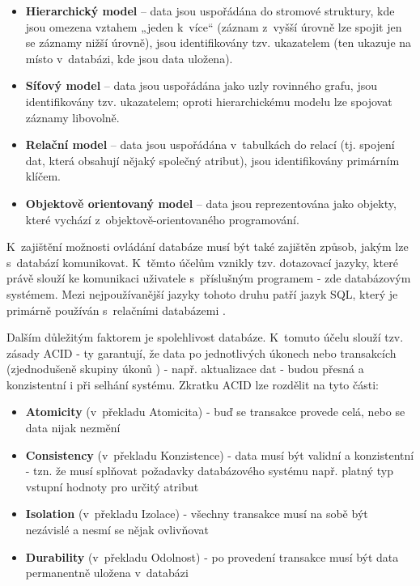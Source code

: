 	\begin{itemize}
		\item \textbf{Hierarchický model} – data jsou uspořádána do stromové struktury, kde jsou omezena vztahem „jeden k~více“ (záznam z~vyšší úrovně lze spojit jen se záznamy nižší úrovně), jsou identifikovány tzv. ukazatelem (ten ukazuje na místo v~databázi, kde jsou data uložena). \cite{HierarchDB}
		\item \textbf{Síťový model} – data jsou uspořádána jako uzly rovinného grafu, jsou identifikovány tzv. ukazatelem; oproti hierarchickému modelu lze spojovat záznamy libovolně. \cite{SitDB} 
		\item \textbf{Relační model} – data jsou uspořádána v~tabulkách do relací (tj. spojení dat, která obsahují nějaký společný atribut), jsou identifikovány primárním klíčem. \cite{RelacDB}
		\item \textbf{Objektově orientovaný model} – data jsou reprezentována jako objekty, které vychází z~objektově-orientovaného programování. \cite{OOPDB}
	\end{itemize}
	
	K~zajištění možnosti ovládání databáze musí být také zajištěn způsob, jakým lze s~databází komunikovat. K~těmto účelům vznikly tzv. dotazovací jazyky, které právě slouží ke komunikaci uživatele s~příslušným programem \cite{DotazJazyk} - zde databázovým systémem. Mezi nejpoužívanější jazyky tohoto druhu patří jazyk SQL, který je primárně používán s~relačními databázemi \cite{SQL}.
	
	Dalším důležitým faktorem je spolehlivost databáze. K~tomuto účelu slouží tzv. zásady ACID - ty garantují, že data po jednotlivých úkonech nebo transakcích (zjednodušeně skupiny úkonů \cite{Transakce}) - např. aktualizace dat - budou přesná a konzistentní i při selhání systému. Zkratku ACID lze rozdělit na tyto části:
	
	\begin{itemize}
		\item \textbf{Atomicity} (v~překladu Atomicita) - buď se transakce provede celá, nebo se data nijak nezmění
		\item \textbf{Consistency} (v~překladu Konzistence) - data musí být validní a konzistentní - tzn. že musí splňovat požadavky databázového systému např. platný typ vstupní hodnoty pro určitý atribut
		\item \textbf{Isolation} (v~překladu Izolace) - všechny transakce musí na sobě být nezávislé a nesmí se nějak ovlivňovat
		\item \textbf{Durability} (v~překladu Odolnost) - po provedení transakce musí být data permanentně uložena v~databázi
		\cite{ACID}
	\end{itemize}
	
